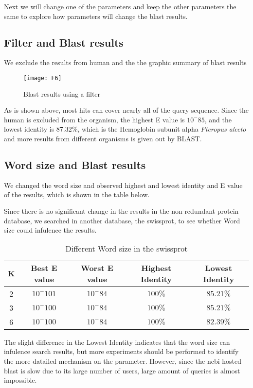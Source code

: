 \documentclass[en,black,10pt,normal]{elegantnote}
\begin{document}
Next we will change one of the parameters and keep the other parameters the same to
explore how parameters will change the blast results.

\subsection{Filter and Blast results}

We exclude the results from human and the the graphic summary of blast results
\begin{figure}[H]
    \centering
    \texttt{[image: F6]}
    \caption{Blast results using a filter}
    \label{F6}
\end{figure}

As is shown above, most hits can cover nearly all of the query sequence.
Since the human is excluded from the organism, the highest E value is $10^-85$, and the lowest identity is $87.32\%$, 
which is the Hemoglobin subunit alpha \textit{Pteropus alecto} and more results from different organisms is given out by BLAST.

\subsection{Word size and Blast results}
We changed the word size and observed highest and lowest identity and E value of the results,
which is shown in the table below.

Since there is no significant change in the results in the non-redundant protein database, 
we searched in another database, the swissprot, to see whether Word size could infulence the results.

\begin{table}[H]
    \caption{Different Word size in the swissprot}
    \centering
    \begin{tabular}{ccccc}
        \toprule
        K&Best E value&Worst E value&Highest Identity&Lowest Identity\\
        \midrule
        2&$10^-101$&$10^-84$&$100\%$&$85.21\%$\\
        3&$10^-100$&$10^-84$&$100\%$&$85.21\%$\\
        6&$10^-100$&$10^-84$&$100\%$&$82.39\%$\\
        \bottomrule
    \end{tabular}
\end{table}

The slight difference in the Lowest Identity indicates that the word size can infulence search results,
but more experiments should be performed to identify the more datailed mechanism on the parameter.
However, since the ncbi hosted blast is slow due to its large number of users, large amount of queries
is almost impossible.
\end{document}
